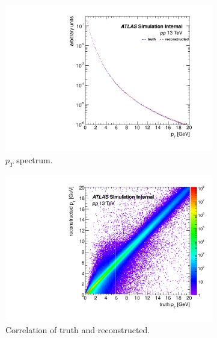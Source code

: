 \begin{figure}[H]

\begin{subfigure}{0.5\textwidth}
\centering
\includegraphics[width=1.\linewidth]{figs/sec_evtSlc/trkEff_pp13_mon_dis_pT.pdf}
\caption{$p_{T}$ spectrum.}
\end{subfigure}
\begin{subfigure}{0.5\textwidth}
\centering
\includegraphics[width=1.\linewidth]{figs/sec_evtSlc/trkEff_pp13_mon_crr_pT.pdf}
\caption{Correlation of truth and reconstructed.}
\end{subfigure}
\begin{subfigure}{0.5\textwidth}
\centering

\end{subfigure}
\end{figure}
